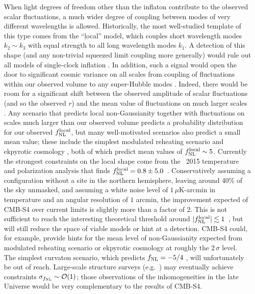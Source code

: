 
When light degrees of freedom other than the inflaton contribute to the observed scalar fluctuations, a much wider degree of coupling between modes of very different wavelengths is allowed. Historically, the most well-studied template of this type comes from the ``local'' model, which couples short wavelength modes $k_2\sim k_3$ with equal strength to all long wavelength modes $k_1$. A detection of this shape (and any non-trivial squeezed limit coupling more generally) would rule out all models of single-clock inflation \cite{Creminelli:2004yq}. In addition, such a signal would open the door to significant cosmic variance on all scales from coupling of fluctuations within our observed volume to any super-Hubble modes \cite{Nelson:2012sb,LoVerde:2013xka,Nurmi:2013xv}. Indeed, there would be room for a significant shift between the observed amplitude of scalar fluctuations (and so the observed $r$) and the mean value of fluctuations on much larger scales \cite{Bonga:2015urq}. Any scenario that predicts local non-Gaussianity together with fluctuations on scales much larger than our observed volume predicts a probability distribution for our observed $f_{\rm NL}^{\rm local}$, but many well-motivated scenarios also predict a small mean value; these include the simplest modulated reheating scenario \cite{Zaldarriaga:2003my} and ekpyrotic cosmology \cite{Lehners:2009ja}, both of which predict mean values of $f_{\rm NL}^{\rm local}\sim5$. 
Currently the strongest constraints on the local shape come from the \planck\ 2015 temperature and polarization analysis that finds $f_{\rm NL}^{\rm local} = 0.8 \pm 5.0$~\cite{Ade:2015ava}. Conservatively assuming a configuration without a site in the northern hemisphere, leaving around $40\%$ of the sky unmasked, and assuming a white noise level of $1\,\mu$K-arcmin in temperature and an angular resolution of $1$ arcmin, the improvement expected of CMB-S4 over current limits is slightly more than a factor of 2. This is not sufficient to reach the interesting theoretical threshold around $|f_{\rm NL}^{\rm local}|\lesssim 1$~\cite{Alvarez:2014vva}, but will still reduce the space of viable models or hint at a detection. CMB-S4 could, for example, provide hints for the mean level of non-Gaussianity expected from modulated reheating scenario or ekpyrotic cosmology at roughly the $2\,\sigma$ level. The simplest curvaton scenario, which predicts $f_{\rm NL} = -5/4$ \cite{Lyth:2001nq}, will unfortunately be out of reach. Large-scale structure surveys (e.g.\ \cite{Dore:2014cca}) may eventually achieve constraints $\sigma_{f_{\rm NL}}\sim\mathcal{O}(1)$; those observations of the inhomogeneities in the late Universe would be very complementary to the results of CMB-S4.


